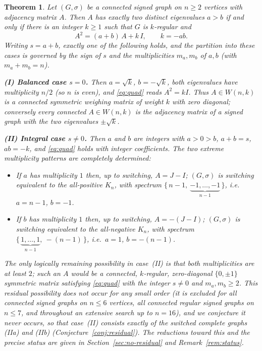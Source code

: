\documentclass{amsart}
\newtheorem{theorem}{Theorem}
\theoremstyle{definition}
\begin{document}
\begin{theorem}\label{thm:main}
Let $(G,\sigma)$ be a connected signed graph on $n\ge 2$ vertices with
adjacency matrix $A$. Then $A$ has exactly two distinct eigenvalues $a>b$ if
and only if there is an integer $k\ge1$ such that $G$ is $k$-regular and
\begin{equation}\label{eq:quad}
A^2=(a+b)\,A+k\,I,\qquad k=-ab .
\end{equation}
Writing $s=a+b$, exactly one of the following holds, and the partition into
these cases is governed by the sign of $s$ and the multiplicities $m_a,m_b$ of
$a,b$ (with $m_a+m_b=n$).

\smallskip
\textbf{(I) Balanced case $s=0$.}
Then $a=\sqrt k$, $b=-\sqrt k$, both eigenvalues have multiplicity $n/2$ (so
$n$ is even), and \eqref{eq:quad} reads $A^2=kI$. Thus $A\in W(n,k)$ is a
connected symmetric weighing matrix of weight $k$ with zero diagonal;
conversely every connected $A\in W(n,k)$ is the adjacency matrix of a signed
graph with the two eigenvalues $\pm\sqrt k$.

\smallskip
\textbf{(II) Integral case $s\ne 0$.}
Then $a$ and $b$ are integers with $a>0>b$, $a+b=s$, $ab=-k$, and
\eqref{eq:quad} holds with integer coefficients. The two extreme multiplicity
patterns are completely determined:
\begin{itemize}
\item[(IIa)] If $a$ has multiplicity $1$ then, up to switching, $A=J-I$;
$(G,\sigma)$ is switching equivalent to the all-positive $K_n$, with spectrum
$\{\,n-1,\ \underbrace{-1,\dots,-1}_{n-1}\,\}$, i.e.\ $a=n-1$, $b=-1$.
\item[(IIb)] If $b$ has multiplicity $1$ then, up to switching, $A=-(J-I)$;
$(G,\sigma)$ is switching equivalent to the all-negative $K_n$, with spectrum
$\{\,\underbrace{1,\dots,1}_{n-1},\ -(n-1)\,\}$, i.e.\ $a=1$, $b=-(n-1)$.
\end{itemize}
The only logically remaining possibility in case~(II) is that \emph{both}
multiplicities are at least $2$; such an $A$ would be a connected, $k$-regular,
zero-diagonal $\{0,\pm1\}$ symmetric matrix satisfying \eqref{eq:quad} with the
integer $s\ne0$ and $m_a,m_b\ge2$. This residual possibility does not occur for
any small order (it is excluded for all connected signed graphs on $n\le6$
vertices, all connected regular signed graphs on $n\le7$, and throughout an
extensive search up to $n=16$), and we conjecture it never occurs, so that
case~(II) consists exactly of the switched complete graphs (IIa) and (IIb)
(Conjecture~\ref{conj:residual}). The reductions toward this and the precise
status are given in Section~\ref{sec:no-residual} and Remark~\ref{rem:status}.
\end{theorem}
\end{document}
